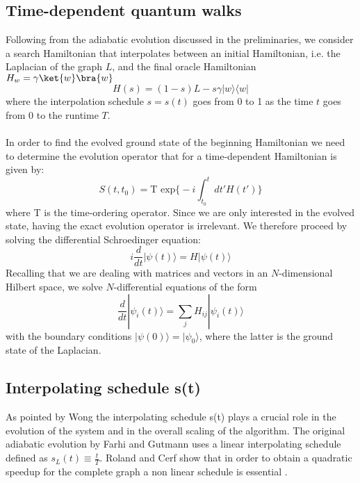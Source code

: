     \subsection{Time-dependent quantum walks}
        Following from the adiabatic evolution discussed in the preliminaries, we consider a search Hamiltonian that interpolates between an initial Hamiltonian, i.e. the Laplacian of the graph $L$, and the final oracle Hamiltonian $H_w=\gamma\ket{w}\bra{w}$
          \begin{equation}
            H(s) = (1-s)L - s\gamma|w\rangle\langle w|
          \end{equation}
        where the interpolation schedule $s=s(t)$ goes from 0 to 1 as the time $t$ goes from 0 to the runtime $T$. \\ \\In order to find the evolved ground state of the beginning Hamiltonian we need to determine the evolution operator that for a time-dependent Hamiltonian is given by:
        \begin{equation}
          S(t,t_0) = \mbox{T } \mbox{exp}\Big\{ -i\int_{t_0}^{t} dt' H(t')\Big\}
        \end{equation}
        where T is the time-ordering operator. Since we are only interested in the evolved state, having the exact evolution operator is irrelevant. We therefore proceed by solving the differential Schroedinger equation:
        \begin{equation}
          i\frac{d}{dt}|\psi(t)\rangle = H |\psi(t)\rangle
        \end{equation}
        Recalling that we are dealing with matrices and vectors in an $N$-dimensional Hilbert space, we solve $N$-differential equations of the form
        \begin{equation}
        \frac{d}{dt}|\psi_i(t)\rangle = \sum_jH_{ij}|\psi_i(t)\rangle
        \end{equation}
        with the boundary conditions $|\psi(0)\rangle = |\psi_0\rangle$, where the latter is the ground state of the Laplacian.\\

    \subsection{Interpolating schedule s(t)}\label{subsec:interpolating schedules}
        As pointed by Wong the interpolating schedule s(t) plays a crucial role in the evolution of the system and in the overall scaling of the algorithm.
        The original adiabatic evolution by Farhi and Gutmann \cite{Farhi2000} uses a linear interpolating schedule defined as $s_L(t) \equiv \frac{t}{T}$. Roland and Cerf show that in order to obtain a quadratic speedup for the complete graph a non linear schedule is essential \cite{Roland2002}.

